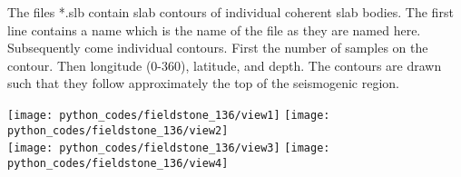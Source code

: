 
The files *.slb contain slab contours of individual coherent slab bodies.
The first line contains a name which is the name of the file as they are
named here.  Subsequently come individual contours.  First the number of
samples on the contour.  Then longitude (0-360), latitude, and depth.
The contours are drawn such that they follow approximately the top of
the seismogenic region.


\begin{center}
\texttt{[image: python\_codes/fieldstone\_136/view1]}
\texttt{[image: python\_codes/fieldstone\_136/view2]}\\
\texttt{[image: python\_codes/fieldstone\_136/view3]}
\texttt{[image: python\_codes/fieldstone\_136/view4]}
\end{center}
